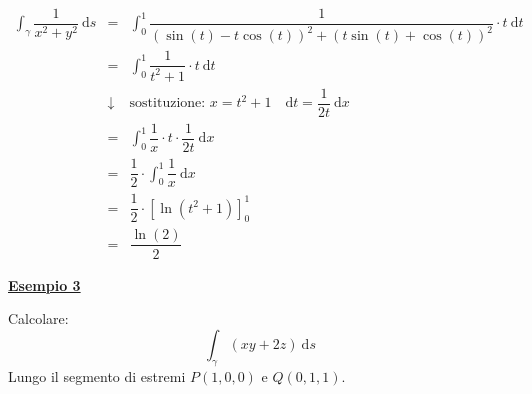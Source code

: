 \documentclass[a4paper]{article}
\newcommand{\example}[1]{\textcolor{Green4}{\textbf{#1}}}
\begin{document}
	\begin{equation*}
		\begin{array}{rcl}
			\displaystyle\int_{\gamma} \dfrac{1}{x^{2}+y^{2}} \:\mathrm{d}s 
			&=&
			\displaystyle\int_{0}^{1} \dfrac{1}{\left(\sin\left(t\right) - t\cos\left(t\right)\right)^{2}+\left(t\sin\left(t\right)+\cos\left(t\right)\right)^{2}} \cdot t \:\mathrm{d}t \\ [1.5em]
			&=&
			\displaystyle\int_{0}^{1} \dfrac{1}{t^{2} + 1} \cdot t \:\mathrm{d}t \\ [1em]
			&\downarrow&
			\text{sostituzione: } x = t^{2}+1 \hspace{1em} \mathrm{d}t = \dfrac{1}{2t} \:\mathrm{d}x \\ [1em]
			&=&
			\displaystyle\int_{0}^{1} \dfrac{1}{x} \cdot t \cdot \dfrac{1}{2t} \:\mathrm{d}x \\ [1em]
			&=&
			\dfrac{1}{2} \cdot \displaystyle\int_{0}^{1} \dfrac{1}{x} \:\mathrm{d}x \\ [1em]
			&=&
			\dfrac{1}{2} \cdot \left[\ln(t^{2}+1)\right]_{0}^{1} \\ [1em]
			&=&
			\dfrac{\ln\left(2\right)}{2}
		\end{array}
	\end{equation*}\newpage

	\begin{flushleft}
		\example{\underline{Esempio 3}}
	\end{flushleft}
	Calcolare:
	\begin{equation*}
		\displaystyle\int_{\gamma} \left(xy+2z\right) \:\mathrm{d}s
	\end{equation*}
	Lungo il segmento di estremi $P\left(1,0,0\right)$ e $Q\left(0,1,1\right)$.\newline
\end{document}

